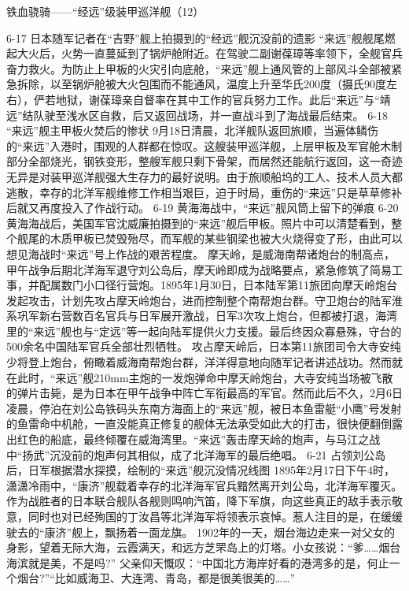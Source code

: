 \documentclass[12pt,UTF8]{ctexbook}
\begin{document}
铁血骁骑——“经远”级装甲巡洋舰（12）

6-17
日本随军记者在“吉野”舰上拍摄到的“经远”舰沉没前的遗影
“来远”舰舰尾燃起大火后，火势一直蔓延到了锅炉舱附近。在驾驶二副谢葆璋等率领下，全舰官兵奋力救火。为防止上甲板的火灾引向底舱，“来远”舰上通风管的上部风斗全部被紧急拆除，以至锅炉舱被大火包围而不能通风，温度上升至华氏200度（摄氏90度左右），俨若地狱，谢葆璋亲自督率在其中工作的官兵努力工作。此后“来远”与“靖远”结队驶至浅水区自救，后又返回战场，并一直战斗到了海战最后结束。
6-18 “来远”舰主甲板火焚后的惨状
9月18日清晨，北洋舰队返回旅顺，当遍体鳞伤的“来远”入港时，围观的人群都在惊叹。这艘装甲巡洋舰，上层甲板及军官舱木制部分全部烧光，钢铁变形，整艘军舰只剩下骨架，而居然还能航行返回，这一奇迹无异是对装甲巡洋舰强大生存力的最好说明。由于旅顺船坞的工人、技术人员大都逃散，幸存的北洋军舰维修工作相当艰巨，迫于时局，重伤的“来远”只是草草修补后就又再度投入了作战行动。
6-19 黄海海战中，“来远”舰风筒上留下的弹痕
6-20
黄海海战后，美国军官沈威廉拍摄到的“来远”舰后甲板。照片中可以清楚看到，整个舰尾的木质甲板已焚毁殆尽，而军舰的某些钢梁也被大火烧得变了形，由此可以想见海战时“来远”号上作战的艰苦程度。
摩天岭，是威海南帮诸炮台的制高点，甲午战争后期北洋海军退守刘公岛后，摩天岭即成为战略要点，紧急修筑了简易工事，并配属数门小口径行营炮。1895年1月30日，日本陆军第11旅团向摩天岭炮台发起攻击，计划先攻占摩天岭炮台，进而控制整个南帮炮台群。守卫炮台的陆军淮系巩军新右营数百名官兵与日军展开激战，日军3次攻上炮台，但都被打退，海湾里的“来远”舰也与“定远”等一起向陆军提供火力支援。最后终因众寡悬殊，守台的500余名中国陆军官兵全部壮烈牺牲。
攻占摩天岭后，日本第11旅团司令大寺安纯少将登上炮台，俯瞰着威海南帮炮台群，洋洋得意地向随军记者讲述战功。然而就在此时，“来远”舰210mm主炮的一发炮弹命中摩天岭炮台，大寺安纯当场被飞散的弹片击毙，是为日本在甲午战争中阵亡军衔最高的军官。然而此后不久，2月6日凌晨，停泊在刘公岛铁码头东南方海面上的“来远”舰，被日本鱼雷艇“小鹰”号发射的鱼雷命中机舱，一直没能真正修复的舰体无法承受如此大的打击，很快便翻倒露出红色的船底，最终倾覆在威海湾里。“来远”轰击摩天岭的炮声，与马江之战中“扬武”沉没前的炮声何其相似，成了北洋海军的最后绝唱。
6-21
占领刘公岛后，日军根据潜水探摸，绘制的“来远”舰沉没情况线图
1895年2月17日下午4时，潇潇冷雨中，“康济”舰载着幸存的北洋海军官兵黯然离开刘公岛，北洋海军覆灭。作为战胜者的日本联合舰队各舰则鸣响汽笛，降下军旗，向这些真正的敌手表示敬意，同时也对已经殉国的丁汝昌等北洋海军将领表示哀悼。惹人注目的是，在缓缓驶去的“康济”舰上，飘扬着一面龙旗。
1902年的一天，烟台海边走来一对父女的身影，望着无际大海，云霞满天，和远方芝罘岛上的灯塔。小女孩说：“爹……烟台海滨就是美，不是吗?”
父亲仰天慨叹：“中国北方海岸好看的港湾多的是，何止一个烟台?”“比如威海卫、大连湾、青岛，都是很美很美的……”
\end{document}
